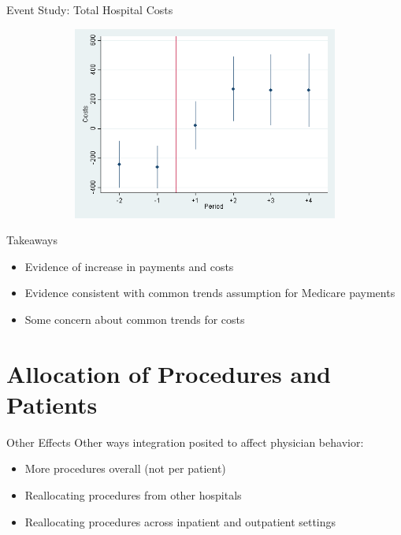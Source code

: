 \documentclass[t]{beamer}
\begin{document}
\begin{frame}{Event Study: Total Hospital Costs}
    \begin{figure}
        \centering
        \includegraphics[height=2.5in,width=5in,keepaspectratio]{EventCharge_All_2011}
    \end{figure}
\end{frame}

\begin{frame}{Takeaways}
    \label{back}
    \begin{itemize}
        \item Evidence of increase in payments and costs
        \item Evidence consistent with common trends assumption for Medicare payments
        \item Some concern about common trends for costs
    \end{itemize}
    \vspace{1in}


\end{frame}

\section{Allocation of Procedures and Patients}
\begin{frame}{Other Effects}
    Other ways integration posited to affect physician behavior:
    \begin{itemize}
        \item More procedures overall (not per patient)
        \item Reallocating procedures from other hospitals
        \item Reallocating procedures across inpatient and outpatient settings
    \end{itemize}
\end{frame}
\end{document}
